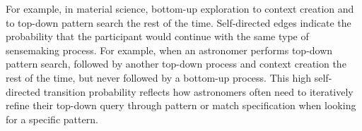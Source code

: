  \par {} For example, in material science, bottom-up exploration  to context creation and to top-down pattern search the rest of the time. Self-directed edges indicate the probability that the participant
 would continue with the same type of sensemaking process.
 For example, when an astronomer performs top-down pattern search, followed by another top-down process and  context creation the rest of the time,
 but never followed by a bottom-up process.
 This high self-directed transition probability
 reflects how astronomers often need to iteratively
 refine their top-down query through pattern
 or match specification when looking for a specific pattern. %
